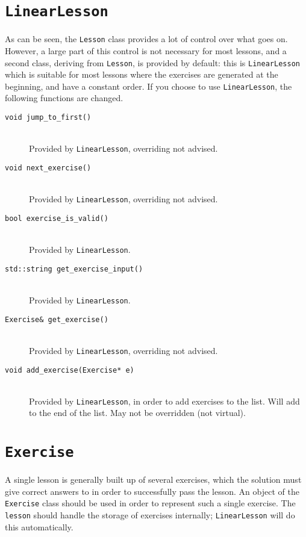 \documentclass[12pt,a4paper]{report}
\begin{document}
		\section{\texttt{LinearLesson}}
		As can be seen, the \texttt{Lesson} class provides a lot of control over
		what goes on.  However, a large part of this control is not necessary for
		most lessons, and a second class, deriving from \texttt{Lesson}, is
		provided by default:  this is \texttt{LinearLesson} which is suitable
		for most lessons where the exercises are generated at the beginning, and
		have a constant order.  If you choose to use \texttt{LinearLesson}, the
		following functions are changed.
		\begin{description}
			\item[\texttt{void jump\_to\_first()}] \hfill \\
				Provided by \texttt{LinearLesson}, overriding not advised.

			\item[\texttt{void next\_exercise()}] \hfill \\
				Provided by \texttt{LinearLesson}, overriding not advised.

			\item[\texttt{bool exercise\_is\_valid()}] \hfill \\
				Provided by \texttt{LinearLesson}.

			\item[\texttt{std::string get\_exercise\_input()}] \hfill \\
				Provided by \texttt{LinearLesson}.

			\item[\texttt{Exercise\& get\_exercise()}] \hfill \\
				Provided by \texttt{LinearLesson}, overriding not advised.
			
			\item[\texttt{void add\_exercise(Exercise* e)}] \hfill \\
				Provided by \texttt{LinearLesson}, in order to add exercises
				to the list.  Will add to the end of the list.  May not be
				overridden (not virtual).
		\end{description}

		\section{\texttt{Exercise}}
		A single lesson is generally built up of several exercises, which the
		solution must give correct answers to in order to successfully pass
		the lesson.  An object of the \texttt{Exercise} class should be used
		in order to represent such a single exercise.  The \texttt{lesson}
		should handle the storage of exercises internally;  \texttt{LinearLesson}
		will do this automatically.
\end{document}
